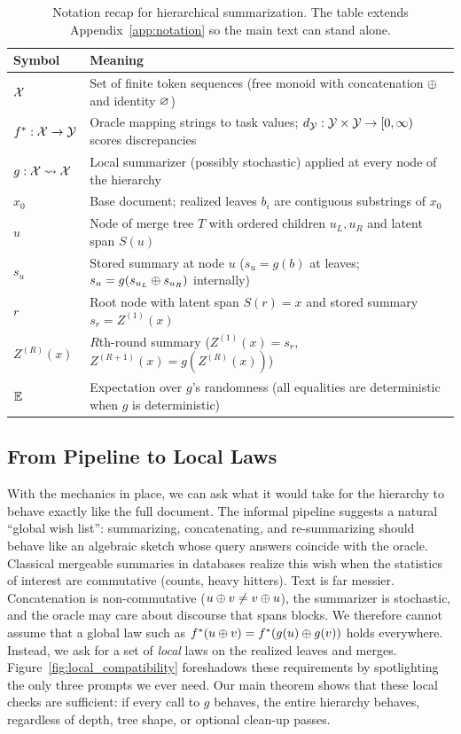 \begin{table}[t]
\centering\small
\begin{tabular}{ll}
\toprule
Symbol & Meaning \\
\midrule
$\mathcal{X}$ & Set of finite token sequences (free monoid with concatenation $\oplus$ and identity $\varnothing$) \\
$f^{\ast}: \mathcal{X} \to \mathcal{Y}$ & Oracle mapping strings to task values; $d_{\mathcal{Y}}: \mathcal{Y} \times \mathcal{Y} \to [0,\infty)$ scores discrepancies \\
$g: \mathcal{X} \rightsquigarrow \mathcal{X}$ & Local summarizer (possibly stochastic) applied at every node of the hierarchy \\
$x_0$ & Base document; realized leaves $b_i$ are contiguous substrings of $x_0$ \\
$u$ & Node of merge tree $T$ with ordered children $u_L,u_R$ and latent span $S(u)$ \\
$s_u$ & Stored summary at node $u$ ($s_u=g(b)$ at leaves; $s_u=g(s_{u_L}\oplus s_{u_R})$ internally) \\
$r$ & Root node with latent span $S(r)=x$ and stored summary $s_r = Z^{(1)}(x)$ \\
$Z^{(R)}(x)$ & $R$th-round summary ($Z^{(1)}(x)=s_r$, $Z^{(R+1)}(x)=g(Z^{(R)}(x))$) \\
$\mathbb{E}$ & Expectation over $g$'s randomness (all equalities are deterministic when $g$ is deterministic) \\
\bottomrule
\end{tabular}
\caption{Notation recap for hierarchical summarization. The table extends Appendix~\ref{app:notation} so the main text can stand alone.}
\label{tab:notation-main}
\end{table}

\subsection{From Pipeline to Local Laws}

With the mechanics in place, we can ask what it would take for the hierarchy to behave exactly like the full document. The informal pipeline suggests a natural ``global wish list'': summarizing, concatenating, and re-summarizing should behave like an algebraic sketch whose query answers coincide with the oracle. Classical mergeable summaries in databases \citep{agarwal2013mergeable} realize this wish when the statistics of interest are commutative (counts, heavy hitters). Text is far messier. Concatenation is non-commutative ($u \oplus v \neq v \oplus u$), the summarizer is stochastic, and the oracle may care about discourse that spans blocks. We therefore cannot assume that a global law such as $f^{\ast}(u \oplus v) = f^{\ast}(g(u) \oplus g(v))$ holds everywhere. Instead, we ask for a set of \emph{local} laws on the realized leaves and merges. Figure~\ref{fig:local_compatibility} foreshadows these requirements by spotlighting the only three prompts we ever need. Our main theorem shows that these local checks are sufficient: if every call to $g$ behaves, the entire hierarchy behaves, regardless of depth, tree shape, or optional clean-up passes.


